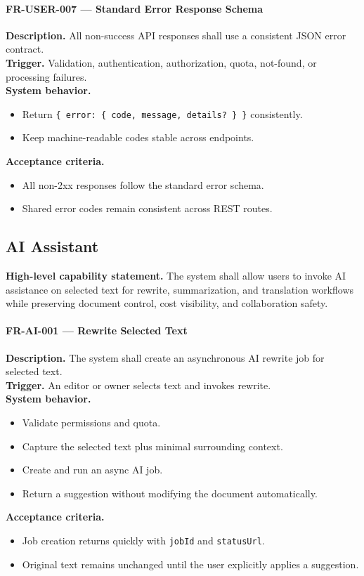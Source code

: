 \paragraph{FR-USER-007 --- Standard Error Response Schema}
\textbf{Description.} All non-success API responses shall use a consistent JSON error contract.\\
\textbf{Trigger.} Validation, authentication, authorization, quota, not-found, or processing failures.\\
\textbf{System behavior.}
\begin{itemize}
  \item Return \texttt{\{ error: \{ code, message, details? \} \}} consistently.
  \item Keep machine-readable codes stable across endpoints.
\end{itemize}
\textbf{Acceptance criteria.}
\begin{itemize}
  \item All non-2xx responses follow the standard error schema.
  \item Shared error codes remain consistent across REST routes.
\end{itemize}

\subsection{AI Assistant}

\textbf{High-level capability statement.} The system shall allow users to invoke AI assistance on
selected text for rewrite, summarization, and translation workflows while preserving document control,
cost visibility, and collaboration safety.

\paragraph{FR-AI-001 --- Rewrite Selected Text}
\textbf{Description.} The system shall create an asynchronous AI rewrite job for selected text.\\
\textbf{Trigger.} An editor or owner selects text and invokes rewrite.\\
\textbf{System behavior.}
\begin{itemize}
  \item Validate permissions and quota.
  \item Capture the selected text plus minimal surrounding context.
  \item Create and run an async AI job.
  \item Return a suggestion without modifying the document automatically.
\end{itemize}
\textbf{Acceptance criteria.}
\begin{itemize}
  \item Job creation returns quickly with \texttt{jobId} and \texttt{statusUrl}.
  \item Original text remains unchanged until the user explicitly applies a suggestion.
\end{itemize}

